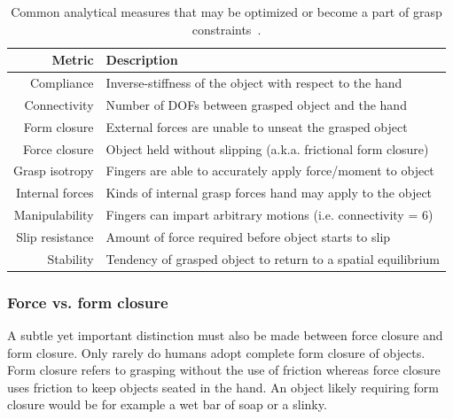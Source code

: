 \begin{table}[h]
\begin{tabular}{rl}
\textbf{Metric}                       & \textbf{Description}                                                               \\ \hline
\multicolumn{1}{|r|}{Compliance}      & \multicolumn{1}{l|}{Inverse-stiffness of the object with respect to the hand}      \\ \hline
\multicolumn{1}{|r|}{Connectivity}    & \multicolumn{1}{l|}{Number of DOFs between grasped object and the hand}            \\ \hline
\multicolumn{1}{|r|}{Form closure}    & \multicolumn{1}{l|}{External forces are unable to unseat the grasped object}       \\ \hline
\multicolumn{1}{|r|}{Force closure}   & \multicolumn{1}{l|}{Object held without slipping (a.k.a. frictional form closure)} \\ \hline
\multicolumn{1}{|r|}{Grasp isotropy}  & \multicolumn{1}{l|}{Fingers are able to accurately apply force/moment to object}   \\ \hline
\multicolumn{1}{|r|}{Internal forces} & \multicolumn{1}{l|}{Kinds of internal grasp forces hand may apply to the object}   \\ \hline
\multicolumn{1}{|r|}{Manipulability}  & \multicolumn{1}{l|}{Fingers can impart arbitrary motions (i.e. connectivity = 6)}  \\ \hline
\multicolumn{1}{|r|}{Slip resistance} & \multicolumn{1}{l|}{Amount of force required before object starts to slip}         \\ \hline
\multicolumn{1}{|r|}{Stability}       & \multicolumn{1}{l|}{Tendency of grasped object to return to a spatial equilibrium} \\ \hline
\end{tabular}
\caption{Common analytical measures that may be optimized or become a part of grasp constraints~\cite{cutkosky1990human}.}
\label{tbl:grasp_metrics}
\end{table}

\subsubsection*{Force vs. form closure}
A subtle yet important distinction must also be made between force closure and form closure.
Only rarely do humans adopt complete form closure of objects.
Form closure refers to grasping without the use of friction whereas force closure uses friction to keep objects seated in the hand.
An object likely requiring form closure would be for example a wet bar of soap or a slinky.

